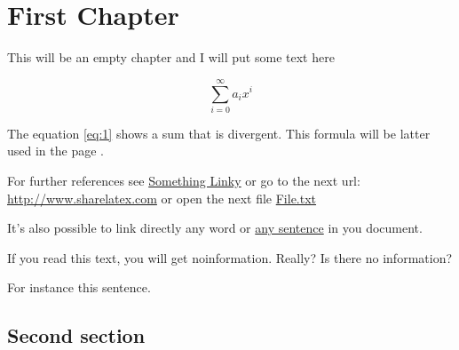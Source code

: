 \documentclass{book}
\begin{document}
\tableofcontents

\chapter{First Chapter}

This will be an empty chapter and I will put some text here

\begin{equation}
\label{eq:1}
\sum_{i=0}^{\infty} a_i x^i
\end{equation}

The equation \ref{eq:1} shows a sum that is divergent. This formula will be latter used in the page \pageref{second}.

For further references see \href{http://www.sharelatex.com}{Something Linky} or go to the next url: \url{http://www.sharelatex.com} or open the next file \href{run:./file.txt}{File.txt}

It's also possible to link directly any word or \hyperlink{thesentence}{any sentence} in you document.

If you read this text, you will get noinformation.  Really?  Is there no information?

For instance \hypertarget{thesentence}{this sentence}.


\Blindtext

\clearpage

\section{Second section} \label{second}

\blindtext



\Blinddocument
\end{document}
